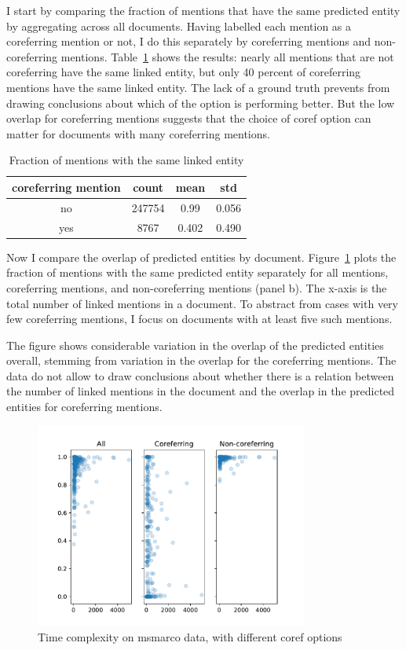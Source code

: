\documentclass[a4paper,11pt]{article}
\numberwithin{equation}{section} %
\begin{document}
I start by comparing the fraction of mentions that have the same predicted entity by aggregating across all documents. Having labelled each mention as a coreferring mention or not, I do this separately by coreferring mentions and non-coreferring mentions. Table~\ref{tab:performance_msmarco_avg} shows the results: nearly all mentions that are not coreferring have the same linked entity, but only 40 percent of coreferring mentions have the same linked entity. 
The lack of a ground truth prevents from drawing conclusions about which of the option is performing better. But the low overlap for coreferring mentions suggests that the choice of coref option can matter for documents with many coreferring mentions.

\begin{table}
 \begin{tabular}{c c c c}
 \hline
 coreferring mention & count & mean & std \\
 \hline 
 no & 247754 & 0.99 & 0.056  \\  
 yes & 8767 & 0.402 & 0.490 \\ 
\hline 
\end{tabular}
\caption{Fraction of mentions with the same linked entity}
\label{tab:performance_msmarco_avg}
\end{table}

Now I compare the overlap of predicted entities by document. Figure~\ref{fig:msmarco_overlap} plots the fraction of mentions with the same predicted entity separately for all mentions, coreferring mentions, and non-coreferring mentions (panel b). The x-axis is the total number of linked mentions in a document.
To abstract from cases with very few coreferring mentions, I focus on documents with at least five such mentions. 

The figure shows considerable variation in the overlap of the predicted entities overall, stemming from variation in the overlap for the coreferring mentions. The data do not allow to draw conclusions about whether there is a relation between the number of linked mentions in the document and the overlap in the predicted entities for coreferring mentions.

\begin{figure}
  \centering
  \includegraphics[width = 0.8\textwidth]{../figs/msmarco_overlap.pdf}
  \caption{Time complexity on msmarco data, with different coref options}
  \label{fig:msmarco_overlap}
\end{figure}
\end{document}
